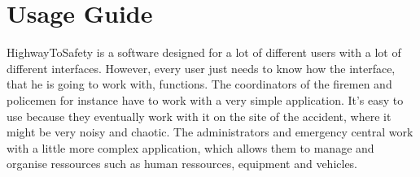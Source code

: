 \chapter{Usage Guide}
\label{chap:usage_guide}
HighwayToSafety is a software designed for a lot of different users with a lot
of different interfaces. However, every user just needs to know how the
interface, that he is going to work with, functions. The coordinators of the
firemen and policemen for instance have to work with a very simple application.
It's easy to use because they eventually work with it on the site of the
accident, where it might be very noisy and chaotic.
The administrators and emergency central work with a little more complex
application, which allows them to manage and organise ressources such as human
ressources, equipment and vehicles.





